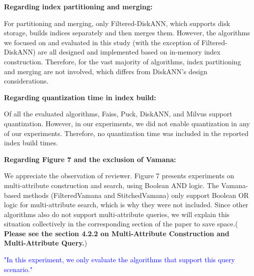 \documentclass[sigconf, nonacm]{acmart}
\begin{document}
\textbf{Regarding index partitioning and merging:}

For partitioning and merging, only Filtered-DiskANN, which supports disk storage, builds indices separately and then merges them. However, the algorithms we focused on and evaluated in this study (with the exception of Filtered-DiskANN) are all designed and implemented based on in-memory index construction. Therefore, for the vast majority of algorithms, index partitioning and merging are not involved, which differs from DiskANN's design considerations.

\textbf{Regarding quantization time in index build:}

Of all the evaluated algorithms, Faiss, Puck, DiskANN, and Milvus support quantization. However, in our experiments, we did not enable quantization in any of our experiments. Therefore, no quantization time was included in the reported index build times.

\textbf{Regarding Figure 7 and the exclusion of Vamana:}

We appreciate the observation of reviewer. Figure 7 presents experiments on multi-attribute construction and search, using Boolean AND logic. The Vamana-based methods (FilteredVamana and StitchedVamana) only support Boolean OR logic for multi-attribute search, which is why they were not included. Since other algorithms also do not support multi-attribute queries, we will explain this situation collectively in the corresponding section of the paper to save space.(
\textbf{Please see the section 4.2.2 on Multi-Attribute Construction and Multi-Attribute Query.})

\textcolor{blue}{"In this experiment, we only evaluate the algorithms that support this query scenario."}


\end{document}
